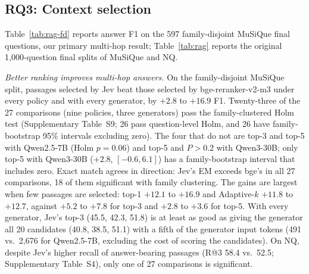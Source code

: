 



\subsection{RQ3: Context selection}

Table~\ref{tab:rag-fd} reports answer F1 on the 597 family-disjoint MuSiQue final questions, our primary multi-hop result; Table~\ref{tab:rag} reports the original 1{,}000-question final splits of MuSiQue and NQ.

\emph{Better ranking improves multi-hop answers.} On the family-disjoint MuSiQue split, passages selected by Jev beat those selected by bge-reranker-v2-m3 under every policy and with every generator, by $+2.8$ to $+16.9$ F1. Twenty-three of the 27 comparisons (nine policies, three generators) pass the family-clustered Holm test (Supplementary Table~S9; 26 pass question-level Holm, and 26 have family-bootstrap 95\% intervals excluding zero). The four that do not are top-3 and top-5 with Qwen2.5-7B (Holm $p=0.06$) and top-5 and $P>0.2$ with Qwen3-30B; only top-5 with Qwen3-30B ($+2.8$, $[-0.6,6.1]$) has a family-bootstrap interval that includes zero. Exact match agrees in direction: Jev's EM exceeds bge's in all 27 comparisons, 18 of them significant with family clustering. The gains are largest when few passages are selected: top-1 $+12.1$ to $+16.9$ and Adaptive-$k$ $+11.8$ to $+12.7$, against $+5.2$ to $+7.8$ for top-3 and $+2.8$ to $+3.6$ for top-5. With every generator, Jev's top-3 (45.5, 42.3, 51.8) is at least as good as giving the generator all 20 candidates (40.8, 38.5, 51.1) with a fifth of the generator input tokens (491 vs.\ 2{,}676 for Qwen2.5-7B, excluding the cost of scoring the candidates). On NQ, despite Jev's higher recall of answer-bearing passages (R@3 58.4 vs.\ 52.5; Supplementary Table~S4), only one of 27 comparisons is significant.


